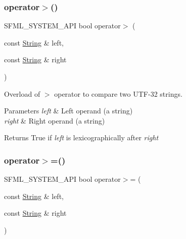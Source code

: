 \subsubsection{\texorpdfstring{operator$>$()}{operator>()}}
{\footnotesize\ttfamily S\+F\+M\+L\+\_\+\+S\+Y\+S\+T\+E\+M\+\_\+\+A\+PI bool operator$>$ (\begin{DoxyParamCaption}\item[{const \mbox{\hyperlink{classsf_1_1_string}{String}} \&}]{left,  }\item[{const \mbox{\hyperlink{classsf_1_1_string}{String}} \&}]{right }\end{DoxyParamCaption})\hspace{0.3cm}{\ttfamily [related]}}



Overload of $>$ operator to compare two U\+T\+F-\/32 strings. 


\begin{DoxyParams}{Parameters}
{\em left} & Left operand (a string) \\
\hline
{\em right} & Right operand (a string)\\
\hline
\end{DoxyParams}
\begin{DoxyReturn}{Returns}
True if {\itshape left} is lexicographically after {\itshape right} \begin{DoxyVerb}\end{DoxyVerb}
 
\end{DoxyReturn}
\mbox{\label{classsf_1_1_string_a8d2979d7829d6616330a768956f251e1}} 
\subsubsection{\texorpdfstring{operator$>$=()}{operator>=()}}
{\footnotesize\ttfamily S\+F\+M\+L\+\_\+\+S\+Y\+S\+T\+E\+M\+\_\+\+A\+PI bool operator$>$= (\begin{DoxyParamCaption}\item[{const \mbox{\hyperlink{classsf_1_1_string}{String}} \&}]{left,  }\item[{const \mbox{\hyperlink{classsf_1_1_string}{String}} \&}]{right }\end{DoxyParamCaption})\hspace{0.3cm}{\ttfamily [related]}}



